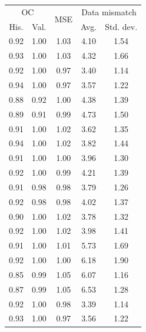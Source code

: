 \begin{tabular}{ccccc}
\toprule
\multicolumn{2}{c}{OC} & 
\multirow{2}{*}{
    MSE
} & 
\multicolumn{2}{c}{Data mismatch} 
\\
His. & Val. &  & Avg. & Std. dev.
\\
\midrule
0.92 & 1.00 & 1.03 & 4.10 & 1.54 \\
0.93 & 1.00 & 1.03 & 4.32 & 1.66 \\
\midrule
0.92 & 1.00 & 0.97 & 3.40 & 1.14 \\
0.94 & 1.00 & 0.97 & 3.57 & 1.22 \\
\midrule
0.88 & 0.92 & 1.00 & 4.38 & 1.39 \\
0.89 & 0.91 & 0.99 & 4.73 & 1.50 \\
\midrule
0.91 & 1.00 & 1.02 & 3.62 & 1.35 \\
0.94 & 1.00 & 1.02 & 3.82 & 1.44 \\
\midrule
0.91 & 1.00 & 1.00 & 3.96 & 1.30 \\
0.92 & 1.00 & 0.99 & 4.21 & 1.39 \\
\midrule
0.91 & 0.98 & 0.98 & 3.79 & 1.26 \\
0.92 & 0.98 & 0.98 & 4.02 & 1.37 \\
\midrule
0.90 & 1.00 & 1.02 & 3.78 & 1.32 \\
0.92 & 1.00 & 1.02 & 3.98 & 1.41 \\
\midrule
0.91 & 1.00 & 1.01 & 5.73 & 1.69 \\
0.92 & 1.00 & 1.00 & 6.18 & 1.90 \\
\midrule
0.85 & 0.99 & 1.05 & 6.07 & 1.16 \\
0.87 & 0.99 & 1.05 & 6.53 & 1.28 \\
\midrule
0.92 & 1.00 & 0.98 & 3.39 & 1.14 \\
0.93 & 1.00 & 0.97 & 3.56 & 1.22 \\
\bottomrule
\end{tabular}
